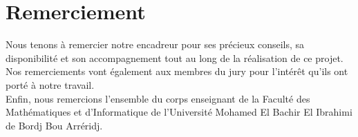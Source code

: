 \chapter*{\hfill Remerciement \hfill}

\vspace{3cm}

\begin{center}
Nous tenons à remercier notre encadreur pour ses précieux conseils, sa disponibilité et son accompagnement tout au long de la réalisation de ce projet.\\[0.5cm]
Nos remerciements vont également aux membres du jury pour l'intérêt qu'ils ont porté à notre travail.\\[0.5cm]
Enfin, nous remercions l'ensemble du corps enseignant de la Faculté des Mathématiques et d'Informatique de l'Université Mohamed El Bachir El Ibrahimi de Bordj Bou Arréridj.

\end{center}